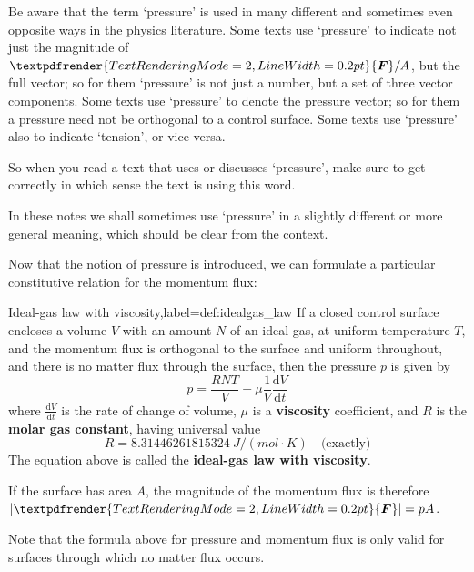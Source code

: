 \documentclass[a4paper,12pt,%
onecolumn,oneside,%
british%
]{memoir}
\providecommand{\href}[2]{#2}
\renewcommand*{\bm}[1]{\textpdfrender{TextRenderingMode=2,LineWidth=0.2pt}{\boldsymbol{#1}}}
\newcommand*{\di}{\mathrm{d}}%
\DeclarePairedDelimiter\abs{\lvert}{\rvert}
\renewcommand*{\|}[1][]{\nonscript\:#1\vert\nonscript\:\mathopen{}}
\newcommand*{\furl}[2]{\href{#1}{#2}\pagenote{\url{#1}}}
\newcommand*{\yvis}{\mu} %
\newcommand*{\yN}{N}
\newcommand*{\yF}{\bm{F}}
\newcommand*{\ypr}{p} %
\newcommand*{\yT}{T}%
\begin{document}
\begin{warning}
  Be aware that the term \enquote*{pressure} is used in many different and sometimes even opposite ways in the physics literature. Some texts use \enquote*{pressure} to indicate not just the magnitude of $\yF/A$, but the full vector; so for them \enquote*{pressure} is not just a number, but a set of three vector components. Some texts use \enquote*{pressure} to denote the pressure vector; so for them a pressure need not be orthogonal to a control surface. Some texts use \enquote*{pressure} also to indicate \enquote*{tension}, or vice versa.

  So when you read a text that uses or discusses \enquote*{pressure}, make sure to get correctly in which sense the text is using this word.

  In these notes we shall sometimes use \enquote*{pressure} in a slightly different or more general meaning, which should be clear from the context.
\end{warning}


Now that the notion of pressure is introduced, we can formulate a particular constitutive relation for the momentum flux:
\begin{definition}{Ideal-gas law with viscosity,label={def:idealgas_law}}
  If a closed control surface encloses a volume $V$ with an amount $\yN$ of an ideal gas, at uniform temperature $\yT$, and the momentum flux is orthogonal to the surface and uniform throughout, and there is no matter flux through the surface, then the pressure $\ypr$ is given by
  \begin{equation}
    \label{eq:ideal_gas_p}
    \ypr = \frac{R \yN \yT}{V}  - \yvis \frac{1}{V}\frac{\di V}{\di t}
  \end{equation}
  where $\frac{\di V}{\di t}$ is the rate of change of volume, $\yvis$ is a \textbf{viscosity} coefficient, and $R$ is the \furl{https://doi.org/10.1351/goldbook.G02579}{\textbf{molar gas constant}}, having universal value
  \begin{equation*}
    R = \qty{8.31446261815324}{J/(mol\cdot K)}\quad\text{(exactly)}
  \end{equation*}
The equation above is called the \textbf{ideal-gas law with viscosity}.

  \smallskip

  If the surface has area $A$, the magnitude of the momentum flux is therefore $\abs{\yF} = \ypr A$.

\end{definition}
Note that the formula above for pressure and momentum flux is only valid for surfaces through which no matter flux occurs.
\end{document}
